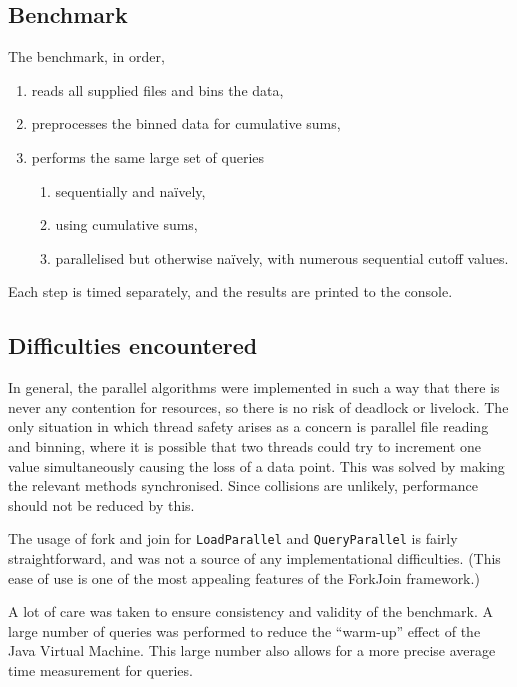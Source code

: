 \documentclass[a4paper,12pt]{article}
\begin{document}
\subsection{Benchmark}

The benchmark, in order, 
\begin{enumerate}
	\item reads all supplied files and bins the data,
	\item preprocesses the binned data for cumulative sums,
	\item performs the same large set of queries
	      \begin{enumerate}
	            \item sequentially and na\"ively,
	            \item using cumulative sums,
	            \item parallelised but otherwise na\"ively, with numerous sequential cutoff values.
	      \end{enumerate}
\end{enumerate}

Each step is timed separately, and the results are printed to the console.

\subsection{Difficulties encountered}

In general, the parallel algorithms were implemented in such a way that there is never any contention for resources, so there is no risk of deadlock or livelock.  The only situation in which thread safety arises as a concern is parallel file reading and binning, where it is possible that two threads could try to increment one value simultaneously causing the loss of a data point.  This was solved by making the relevant methods synchronised.  Since collisions are unlikely, performance should not be reduced by this.

The usage of fork and join for \texttt{LoadParallel} and \texttt{QueryParallel} is fairly straightforward, and was not a source of any implementational difficulties.  (This ease of use is one of the most appealing features of the ForkJoin framework.)

A lot of care was taken to ensure consistency and validity of the benchmark.  A large number of queries was performed to reduce the ``warm-up'' effect of the Java Virtual Machine.  This large number also allows for a more precise average time measurement for queries.
\end{document}
